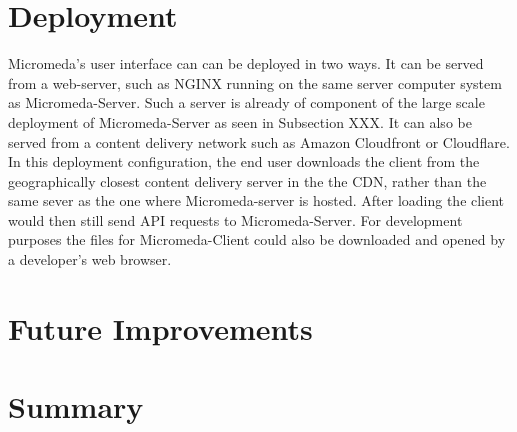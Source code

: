 \section{Deployment}

Micromeda's user interface can can be deployed in two ways. It can be served from a web-server, such as NGINX running on the same server computer system as Micromeda-Server. Such a server is already of component of the large scale deployment of Micromeda-Server as seen in Subsection XXX. It can also be served from a content delivery network such as Amazon Cloudfront or Cloudflare. In this deployment configuration, the end user downloads the client from the geographically closest content delivery server in the the CDN, rather than the same sever as the one where Micromeda-server is hosted. After loading the client would then still send API requests to Micromeda-Server. For development purposes the files for Micromeda-Client could also be downloaded and opened by a developer's web browser.

\section{Future Improvements} \label{client-improvements}

\section{Summary} 